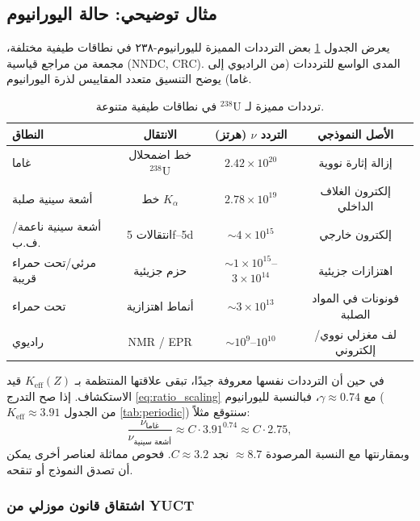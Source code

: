 \documentclass[12pt,a4paper]{article}
\theoremstyle{remark}
\begin{document}
	\subsection{مثال توضيحي: حالة اليورانيوم}
	
	يعرض الجدول \ref{tab:uranium_spectrum} بعض الترددات المميزة لليورانيوم-٢٣٨ في نطاقات طيفية مختلفة، مجمعة من مراجع قياسية (NNDC, CRC). المدى الواسع للترددات (من الراديوي إلى غاما) يوضح التنسيق متعدد المقاييس لذرة اليورانيوم.
	
	\begin{table}[htbp]
		\centering
		\caption{ترددات مميزة لـ \(^{238}\mathrm{U}\) في نطاقات طيفية متنوعة.}
		\label{tab:uranium_spectrum}
		\begin{tabular}{@{}lccc@{}}
			\toprule
			\textbf{النطاق} & \textbf{الانتقال} & \textbf{التردد \(\nu\) (هرتز)} & \textbf{الأصل النموذجي} \\
			\midrule
			غاما & خط اضمحلال \(^{238}\mathrm{U}\) & \(2.42\times10^{20}\) & إزالة إثارة نووية \\
			أشعة سينية صلبة & خط \(K_\alpha\) & \(2.78\times10^{19}\) & إلكترون الغلاف الداخلي \\
			أشعة سينية ناعمة/ف.ب. & انتقالات 5f–5d & \(\sim 4\times10^{15}\) & إلكترون خارجي \\
			مرئي/تحت حمراء قريبة & حزم جزيئية & \(\sim 1\times10^{15}\)–\(3\times10^{14}\) & اهتزازات جزيئية \\
			تحت حمراء & أنماط اهتزازية & \(\sim 3\times10^{13}\) & فونونات في المواد الصلبة \\
			راديوي & NMR / EPR & \(\sim 10^9\)–\(10^{10}\) & لف مغزلي نووي/إلكتروني \\
			\bottomrule
		\end{tabular}
	\end{table}
	
	في حين أن الترددات نفسها معروفة جيدًا، تبقى علاقتها المنتظمة بـ \(K_{\mathrm{eff}}(Z)\) قيد الاستكشاف. إذا صح التدرج \eqref{eq:ratio_scaling} مع \(\gamma \approx 0.74\)، فبالنسبة لليورانيوم (\(K_{\mathrm{eff}}\approx 3.91\) من الجدول \ref{tab:periodic}) سنتوقع مثلاً:
	\[
	\frac{\nu_{\text{غاما}}}{\nu_{\text{أشعة سينية}}} \approx C \cdot 3.91^{0.74} \approx C \cdot 2.75,
	\]
	وبمقارنتها مع النسبة المرصودة \(\approx 8.7\) نجد \(C \approx 3.2\). فحوص مماثلة لعناصر أخرى يمكن أن تصدق النموذج أو تنقحه.
	
	\subsubsection{اشتقاق قانون موزلي من YUCT}
	\label{sec:moseley_derivation}
	
\end{document}
